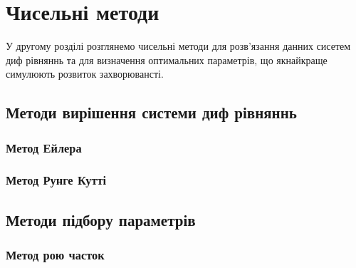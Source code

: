 
\chapter{Чисельні методи}


У другому розділі розглянемо чисельні методи для розв'язання 
данних сисетем диф рівняннь та для визначення оптимальних параметрів, що 
якнайкраще симулюють розвиток захворювансті.

\section{Методи вирішення системи диф рівняннь}

\subsection{Метод Ейлера}

\subsection{Метод Рунге Кутті}

\section{Методи підбору параметрів}


\subsection{Метод рою часток}

